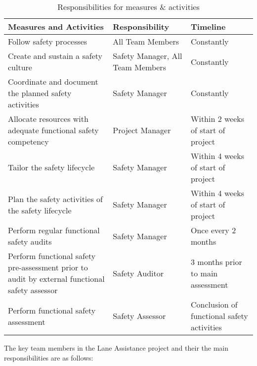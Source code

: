 \begin{table}[!htpb]
\caption{Responsibilities for measures \& activities}
\begin{center}
\scriptsize
\renewcommand{\arraystretch}{1.4}
\begin{tabular}{ L{5.5cm}|L{2.8cm}|L{4cm}  }
 \hline
{}
Measures and Activities & Responsibility & Timeline \\\hline
Follow safety processes & All Team Members & Constantly \\\hline
Create and sustain a safety culture & Safety Manager, All Team Members & Constantly \\\hline
Coordinate and document the planned safety activities& Safety Manager & Constantly \\\hline
Allocate resources with adequate functional safety competency & Project Manager & Within 2 weeks of start of project \\\hline
Tailor the safety lifecycle & Safety Manager & Within 4 weeks of start of project \\\hline
Plan the safety activities of the safety lifecycle& Safety Manager & Within 4 weeks of start of project \\\hline
Perform regular functional safety audits & Safety Manager & Once every 2 months \\\hline
Perform functional safety pre-assessment prior to audit by 
external functional safety assessor & Safety Auditor & 3 months prior to main
assessment\\\hline
Perform functional safety assessment & Safety Assessor & Conclusion of functional safety activities\\\hline

 \hline
\end{tabular}
\end{center}
\label{tab:measures}
\end{table}

The key team members in the Lane Assistance project and their the main
responsibilities are as follows:

